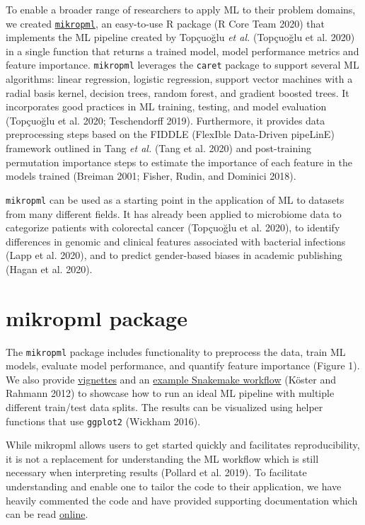 \documentclass[
]{article}
\begin{document}
To enable a broader range of researchers to apply ML to their problem
domains, we created
\href{https://github.com/SchlossLab/mikropml/}{\texttt{mikropml}}, an
easy-to-use R package (R Core Team 2020) that implements the ML pipeline
created by Topçuoğlu \emph{et al.} (Topçuoğlu et al. 2020) in a single
function that returns a trained model, model performance metrics and
feature importance. \texttt{mikropml} leverages the \texttt{caret}
package to support several ML algorithms: linear regression, logistic
regression, support vector machines with a radial basis kernel, decision
trees, random forest, and gradient boosted trees. It incorporates good
practices in ML training, testing, and model evaluation (Topçuoğlu et
al. 2020; Teschendorff 2019). Furthermore, it provides data
preprocessing steps based on the FIDDLE (FlexIble Data-Driven pipeLinE)
framework outlined in Tang \emph{et al.} (Tang et al. 2020) and
post-training permutation importance steps to estimate the importance of
each feature in the models trained (Breiman 2001; Fisher, Rudin, and
Dominici 2018).

\texttt{mikropml} can be used as a starting point in the application of
ML to datasets from many different fields. It has already been applied
to microbiome data to categorize patients with colorectal cancer
(Topçuoğlu et al. 2020), to identify differences in genomic and clinical
features associated with bacterial infections (Lapp et al. 2020), and to
predict gender-based biases in academic publishing (Hagan et al. 2020).

\hypertarget{mikropml-package}{%
\section{mikropml package}\label{mikropml-package}}

The \texttt{mikropml} package includes functionality to preprocess the
data, train ML models, evaluate model performance, and quantify feature
importance (Figure 1). We also provide
\href{http://www.schlosslab.org/mikropml/articles/index.html}{vignettes}
and an
\href{https://github.com/SchlossLab/mikropml-snakemake-workflow}{example
Snakemake workflow} (Köster and Rahmann 2012) to showcase how to run an
ideal ML pipeline with multiple different train/test data splits. The
results can be visualized using helper functions that use
\texttt{ggplot2} (Wickham 2016).

While mikropml allows users to get started quickly and facilitates
reproducibility, it is not a replacement for understanding the ML
workflow which is still necessary when interpreting results (Pollard et
al. 2019). To facilitate understanding and enable one to tailor the code
to their application, we have heavily commented the code and have
provided supporting documentation which can be read
\href{http://www.schlosslab.org/mikropml/}{online}.
\end{document}

